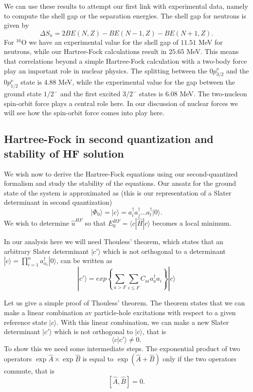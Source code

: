 \documentclass[%
oneside,                 %
final,                   %
10pt]{article}
\newenvironment{doconceexercise}{}{}
\begin{document}
\begin{doconceexercise}
\noindent
We can use these results to attempt our first link with experimental data, namely to compute the shell gap or the separation energies. The shell gap for neutrons is given by
\[
\Delta S_n= 2BE(N,Z)-BE(N-1,Z)-BE(N+1,Z).
\]
For $^{16}\mbox{O}$  we have an experimental value for the  shell gap of $11.51$ MeV for neutrons, while our Hartree-Fock calculations result in $25.65$ MeV. This means that correlations beyond a simple Hartree-Fock calculation with a two-body force play an important role in nuclear physics.
The splitting between the $0p_{3/2}^{\nu}$ and the $0p_{1/2}^{\nu}$ state is 4.88 MeV, while the experimental value for the gap between the ground state $1/2^{-}$ and the first excited $3/2^{-}$ states is 6.08 MeV. The two-nucleon spin-orbit force plays a central role here. In our discussion of nuclear forces we will see how the spin-orbit force comes into play here.

\end{doconceexercise}

\subsection*{Hartree-Fock in second quantization and stability of HF solution}

We wish now to derive the Hartree-Fock equations using our second-quantized formalism and study the stability of the equations. 
Our ansatz for the ground state of the system is approximated as (this is our representation of a Slater determinant in second quantization)
\[   
|\Phi_0\rangle = |c\rangle = a^{\dagger}_i a^{\dagger}_j \dots a^{\dagger}_l|0\rangle.
\]
We wish to determine $\hat{u}^{HF}$ so that 
$E_0^{HF}= \langle c|\hat{H}| c\rangle$ becomes a local minimum. 

In our analysis here we will need Thouless' theorem, which states that
an arbitrary Slater determinant $|c'\rangle$ which is not orthogonal to a determinant
$| c\rangle ={\displaystyle\prod_{i=1}^{n}}
a_{\alpha_{i}}^{\dagger}|0\rangle$, can be written as
\[
|c'\rangle=exp\left\{\sum_{a>F}\sum_{i\le F}C_{ai}a_{a}^{\dagger}a_{i}\right\}| c\rangle 
\]

Let us give a simple proof of Thouless' theorem. The theorem states that we can make a linear combination av particle-hole excitations  with respect to a given reference state $\vert c\rangle$. With this linear combination, we can make a new Slater determinant $\vert c'\rangle $ which is not orthogonal to 
$\vert c\rangle$, that is
\[
\langle c|c'\rangle \ne 0.
\] 
To show this we need some intermediate steps. The exponential product of two operators  $\exp{\hat{A}}\times\exp{\hat{B}}$ is equal to $\exp{(\hat{A}+\hat{B})}$ only if the two operators commute, that is
\[
[\hat{A},\hat{B}] = 0.
\]
\end{document}

